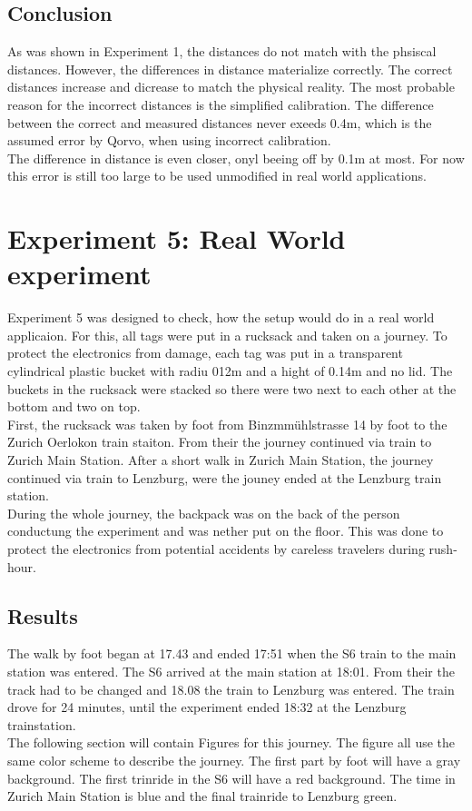 \subsection{Conclusion}
\label{s:exp_4_conclusion}
As was shown in Experiment 1, the distances do not match with the phsiscal distances.
However, the differences in distance materialize correctly.
The correct distances increase and dicrease to match the physical reality.
The most probable reason for the incorrect distances is the simplified calibration.
The difference between the correct and measured distances never exeeds 0.4m, which is the assumed error by Qorvo, when using incorrect calibration.\\
The difference in distance is even closer, onyl beeing off by 0.1m at most.
For now this error is still too large to be used unmodified in real world applications.


\section{Experiment 5: Real World experiment}
\label{s:exp_5_real_world}
Experiment 5 was designed to check, how the setup would do in a real world applicaion.
For this, all tags were put in a rucksack and taken on a journey.
To protect the electronics from damage, each tag was put in a transparent cylindrical plastic bucket with radiu 012m and a hight of 0.14m and no lid.
The buckets in the rucksack were stacked so there were two next to each other at the bottom and two on top.\\
First, the rucksack was taken by foot from Binzmmühlstrasse 14 by foot to the Zurich Oerlokon train staiton.
From their the journey continued via train to Zurich Main Station.
After a short walk in Zurich Main Station, the journey continued via train to Lenzburg, were the jouney ended at the Lenzburg train station. \\
During the whole journey, the backpack was on the back of the person conductung the experiment and was nether put on the floor.
This was done to protect the electronics from potential accidents by careless travelers during rush-hour.

\subsection{Results}
\label{s:exp5_real_worl_results}
The walk by foot began at 17.43 and ended 17:51 when the S6 train to the main station was entered.
The S6 arrived at the main station at 18:01.
From their the track had to be changed and 18.08 the train to Lenzburg was entered.
The train drove for 24 minutes, until the experiment ended 18:32 at the Lenzburg trainstation.\\
The following section will contain Figures for this journey.
The figure all use the same color scheme to describe the journey.
The first part by foot will have a gray background.
The first trinride in the S6 will have a red background.
The time in Zurich Main Station is blue and the final trainride to Lenzburg green.


